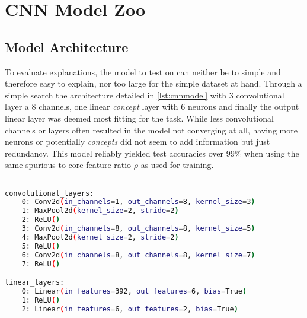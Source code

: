 \section{CNN Model Zoo}\label{section:training}
\subsection{Model Architecture}
To evaluate explanations, the model to test on can neither be to simple and therefore easy to explain, nor too large for the simple dataset at hand.
Through a simple search the architecture detailed in \autoref{lst:cnnmodel} with 3 convolutional layer a 8 channels, one linear \textit{concept} layer with 6 neurons and finally the output linear layer was deemed most fitting for the task. While less convolutional channels or layers often resulted in the model not converging at all, having more neurons or potentially \textit{concepts} did not seem to add information but just redundancy.
This model reliably yielded test accuracies over 99\% when using the same spurious-to-core feature ratio $\rho$ as used for training.

\begin{lstlisting}[language=bash, label=lst:cnnmodel]

convolutional_layers: 
    0: Conv2d(in_channels=1, out_channels=8, kernel_size=3)
    1: MaxPool2d(kernel_size=2, stride=2)
    2: ReLU()
    3: Conv2d(in_channels=8, out_channels=8, kernel_size=5)
    4: MaxPool2d(kernel_size=2, stride=2)
    5: ReLU()
    6: Conv2d(in_channels=8, out_channels=8, kernel_size=7)
    7: ReLU()

linear_layers:
    0: Linear(in_features=392, out_features=6, bias=True)
    1: ReLU()
    2: Linear(in_features=6, out_features=2, bias=True)  

\end{lstlisting}

